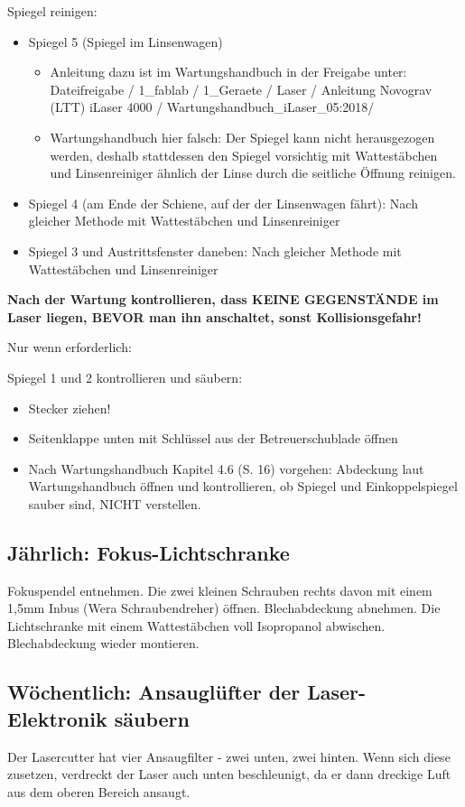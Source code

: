 \documentclass{\basedir/fablab-document}
\begin{document}
	Spiegel reinigen:
	\begin{itemize}
		\item Spiegel 5 (Spiegel im Linsenwagen)
		\begin{itemize}
			\item 	Anleitung dazu ist im Wartungshandbuch in der Freigabe unter: Dateifreigabe / 1\_fablab / 1\_Geraete / Laser / Anleitung Novograv (LTT) iLaser 4000 / Wartungshandbuch\_iLaser\_05:2018/
			\item 	Wartungshandbuch hier falsch: Der Spiegel kann nicht herausgezogen werden, deshalb stattdessen den Spiegel vorsichtig mit Wattestäbchen und Linsenreiniger ähnlich der Linse durch die seitliche Öffnung reinigen.
		\end{itemize}
		\item Spiegel 4 (am Ende der Schiene, auf der der Linsenwagen fährt): Nach gleicher Methode mit Wattestäbchen und Linsenreiniger
		\item Spiegel 3 und Austrittsfenster daneben: Nach gleicher Methode mit Wattestäbchen und Linsenreiniger
	\end{itemize}

\textbf{Nach der Wartung kontrollieren, dass KEINE GEGENSTÄNDE im Laser liegen, BEVOR man ihn anschaltet, sonst Kollisionsgefahr!}

	Nur wenn erforderlich:

	Spiegel 1 und 2 kontrollieren und säubern:
	\begin{itemize}
		\item Stecker ziehen!
		\item Seitenklappe unten mit Schlüssel aus der Betreuerschublade öffnen
		\item Nach Wartungshandbuch Kapitel 4.6 (S. 16) vorgehen: Abdeckung laut Wartungshandbuch öffnen und kontrollieren, ob Spiegel und Einkoppelspiegel sauber sind, NICHT verstellen.
	\end{itemize}

\subsection{Jährlich: Fokus-Lichtschranke}
Fokuspendel entnehmen. Die zwei kleinen Schrauben rechts davon mit einem 1,5mm Inbus (Wera Schraubendreher) öffnen. Blechabdeckung abnehmen. Die Lichtschranke mit einem Wattestäbchen voll Isopropanol abwischen. Blechabdeckung wieder montieren.

\subsection{Wöchentlich: Ansauglüfter der Laser-Elektronik säubern}
	Der Lasercutter hat vier Ansaugfilter - zwei unten, zwei hinten. Wenn sich diese zusetzen, verdreckt der Laser auch unten beschleunigt, da er dann dreckige Luft aus dem oberen Bereich ansaugt.
\end{document}
